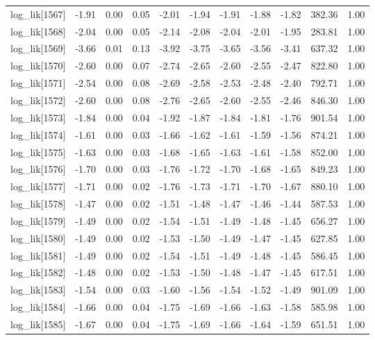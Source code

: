 \begin{table}[ht]
\begin{tabular}{rrrrrrrrrrr}
  log\_lik[1567] & -1.91 & 0.00 & 0.05 & -2.01 & -1.94 & -1.91 & -1.88 & -1.82 & 382.36 & 1.00 \\ 
  log\_lik[1568] & -2.04 & 0.00 & 0.05 & -2.14 & -2.08 & -2.04 & -2.01 & -1.95 & 283.81 & 1.00 \\ 
  log\_lik[1569] & -3.66 & 0.01 & 0.13 & -3.92 & -3.75 & -3.65 & -3.56 & -3.41 & 637.32 & 1.00 \\ 
  log\_lik[1570] & -2.60 & 0.00 & 0.07 & -2.74 & -2.65 & -2.60 & -2.55 & -2.47 & 822.80 & 1.00 \\ 
  log\_lik[1571] & -2.54 & 0.00 & 0.08 & -2.69 & -2.58 & -2.53 & -2.48 & -2.40 & 792.71 & 1.00 \\ 
  log\_lik[1572] & -2.60 & 0.00 & 0.08 & -2.76 & -2.65 & -2.60 & -2.55 & -2.46 & 846.30 & 1.00 \\ 
  log\_lik[1573] & -1.84 & 0.00 & 0.04 & -1.92 & -1.87 & -1.84 & -1.81 & -1.76 & 901.54 & 1.00 \\ 
  log\_lik[1574] & -1.61 & 0.00 & 0.03 & -1.66 & -1.62 & -1.61 & -1.59 & -1.56 & 874.21 & 1.00 \\ 
  log\_lik[1575] & -1.63 & 0.00 & 0.03 & -1.68 & -1.65 & -1.63 & -1.61 & -1.58 & 852.00 & 1.00 \\ 
  log\_lik[1576] & -1.70 & 0.00 & 0.03 & -1.76 & -1.72 & -1.70 & -1.68 & -1.65 & 849.23 & 1.00 \\ 
  log\_lik[1577] & -1.71 & 0.00 & 0.02 & -1.76 & -1.73 & -1.71 & -1.70 & -1.67 & 880.10 & 1.00 \\ 
  log\_lik[1578] & -1.47 & 0.00 & 0.02 & -1.51 & -1.48 & -1.47 & -1.46 & -1.44 & 587.53 & 1.00 \\ 
  log\_lik[1579] & -1.49 & 0.00 & 0.02 & -1.54 & -1.51 & -1.49 & -1.48 & -1.45 & 656.27 & 1.00 \\ 
  log\_lik[1580] & -1.49 & 0.00 & 0.02 & -1.53 & -1.50 & -1.49 & -1.47 & -1.45 & 627.85 & 1.00 \\ 
  log\_lik[1581] & -1.49 & 0.00 & 0.02 & -1.54 & -1.51 & -1.49 & -1.48 & -1.45 & 586.45 & 1.00 \\ 
  log\_lik[1582] & -1.48 & 0.00 & 0.02 & -1.53 & -1.50 & -1.48 & -1.47 & -1.45 & 617.51 & 1.00 \\ 
  log\_lik[1583] & -1.54 & 0.00 & 0.03 & -1.60 & -1.56 & -1.54 & -1.52 & -1.49 & 901.09 & 1.00 \\ 
  log\_lik[1584] & -1.66 & 0.00 & 0.04 & -1.75 & -1.69 & -1.66 & -1.63 & -1.58 & 585.98 & 1.00 \\ 
  log\_lik[1585] & -1.67 & 0.00 & 0.04 & -1.75 & -1.69 & -1.66 & -1.64 & -1.59 & 651.51 & 1.00 \\ 

\end{tabular}
\end{table}

